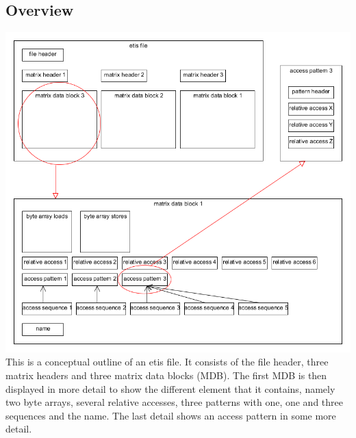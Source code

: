 \subsection{Overview}
\includegraphics[width=\textwidth]{fileformat/structure}
This is a conceptual outline of an etis file. It consists of the file header, three matrix headers and three matrix data blocks (MDB). The first MDB is then displayed in more detail to show the different element
that it contains, namely two byte arrays, several relative accesses, three patterns with one, one and three sequences and the name. The last detail shows an access pattern in some more detail.
